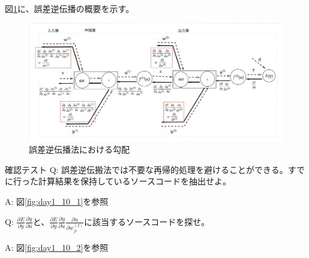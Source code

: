 \documentclass{ltjsarticle}
\begin{document}
図\ref{fig:backprop}に、誤差逆伝播の概要を示す。
\begin{figure}[htbp]
  \centering
  \includegraphics[width=13cm]{./capture/backprop.png}
  \caption{誤差逆伝播法における勾配}
  \label{fig:backprop}
\end{figure}

\newpage

\begin{itembox}[l]{確認テスト}
  Q: 誤差逆伝搬法では不要な再帰的処理を避けることができる。すでに行った計算結果を保持しているソースコードを抽出せよ。

  A: 図\ref{fig:day1_10_1}を参照

  Q: $\frac{\partial E}{\partial y} \frac{\partial y}{\partial u}$と、$\frac{\partial E}{\partial y} \frac{\partial y}{\partial u} \frac{\partial u}{\partial w_{ji}^{(2)}}$に該当するソースコードを探せ。

  A: 図\ref{fig:day1_10_2}を参照
\end{itembox}
\end{document}

